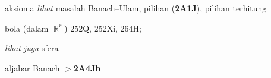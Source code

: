  aksioma {\it lihat} masalah Banach--Ulam, pilihan ({\bf 2A1J}), pilihan terhitung

































































\indexmedskip





































 bola (dalam $\BbbR^r$) 252Q, 252Xi, 264H;
  
  {\it lihat juga} sfera


 aljabar Banach $\pmb{>}${\bf 2A4Jb}




